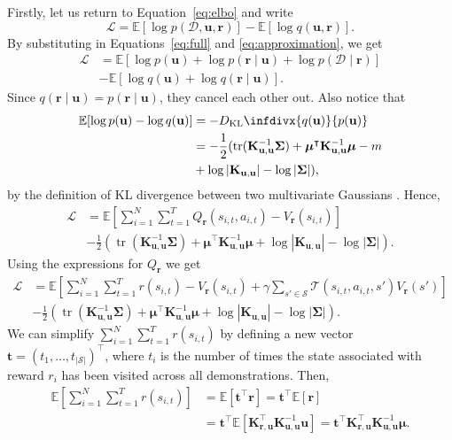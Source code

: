 \documentclass{mpaper}
\DeclareMathOperator{\tr}{tr}
\newcommand{\DKL}{D_{\mathrm{KL}}\infdivx}
\newcommand{\V}{V_{\mathbf{r}}}
\newcommand{\Kuu}{\mathbf{K}_{\mathbf{u},\mathbf{u}}}
\newcommand{\Kru}{\mathbf{K}_{\mathbf{r},\mathbf{u}}}
\newcommand{\pfull}{p(\mathcal{D}, \mathbf{u}, \mathbf{r})}
\newcommand{\approximation}{q(\mathbf{u}, \mathbf{r})}
\begin{document}
Firstly, let us return to Equation~\eqref{eq:elbo} and write
\[
  \mathcal{L} = \mathbb{E}[\log\pfull] - \mathbb{E}[\log\approximation].
\]
By substituting in Equations~\eqref{eq:full} and \eqref{eq:approximation}, we get
\begin{align*}
  \mathcal{L} &= \mathbb{E}[\log p(\mathbf{u}) + \log p(\mathbf{r} \mid \mathbf{u}) + \log p(\mathcal{D} \mid \mathbf{r})] \\
              &- \mathbb{E}[\log q(\mathbf{u}) + \log q(\mathbf{r} \mid \mathbf{u})].
\end{align*}
Since $q(\mathbf{r} \mid \mathbf{u}) = p(\mathbf{r} \mid \mathbf{u})$, they
cancel each other out. Also notice that
\begin{align*}
  \mathbb{E}[\log p(\mathbf{u}) - \log q(\mathbf{u})] &= -\DKL{q(\mathbf{u})}{p(\mathbf{u})} \\
                                                      &= -\frac{1}{2} (\tr (\Kuu^{-1}\bm\Sigma) + \bm\mu^\intercal\Kuu^{-1}\bm\mu - m \\
                                                      &+ \log |\Kuu| - \log |\bm\Sigma|),
\end{align*}
by the definition of KL divergence between two multivariate Gaussians
\cite{kl}. Hence,
\begin{align*}
  \mathcal{L} &= \mathbb{E}\left[ \sum_{i=1}^N \sum_{t=1}^T Q_{\mathbf{r}}(s_{i,t}, a_{i,t}) - \V(s_{i,t}) \right] \\
              &- \frac{1}{2} \left(\tr \left( \Kuu^{-1}\bm\Sigma \right) + \bm\mu^\intercal\Kuu^{-1}\bm\mu + \log |\Kuu| - \log |\bm\Sigma| \right).
\end{align*}
Using the expressions for $Q_{\mathbf{r}}$ we get
\begin{align*}
  \mathcal{L} &= \mathbb{E}\left[\sum_{i=1}^N \sum_{t=1}^T r(s_{i,t}) - \V(s_{i,t}) + \gamma\sum_{s' \in \mathcal{S}} \mathcal{T}(s_{i,t}, a_{i,t}, s')\V(s') \right] \\
              &- \frac{1}{2} \left(\tr \left( \Kuu^{-1}\bm\Sigma \right) + \bm\mu^\intercal\Kuu^{-1}\bm\mu + \log |\Kuu| - \log |\bm\Sigma| \right).
\end{align*}
We can simplify $\sum_{i=1}^N\sum_{t=1}^Tr(s_{i,t})$ by defining a new vector
$\mathbf{t} = (t_1, \dots, t_{|\mathcal{S}|})^\intercal$, where $t_i$ is the
number of times the state associated with reward $r_i$ has been visited
across all demonstrations. Then,
\begin{align*}
  \mathbb{E} \left[ \sum_{i=1}^N\sum_{t=1}^Tr(s_{i,t}) \right] &= \mathbb{E}[\mathbf{t}^\intercal\mathbf{r}] = \mathbf{t}^\intercal\mathbb{E}[\mathbf{r}] \\
                                                               &= \mathbf{t}^\intercal\mathbb{E}\left[\Kru^\intercal\Kuu^{-1}\mathbf{u}\right] = \mathbf{t}^\intercal\Kru^\intercal\Kuu^{-1}\bm\mu.
\end{align*}
\end{document}
